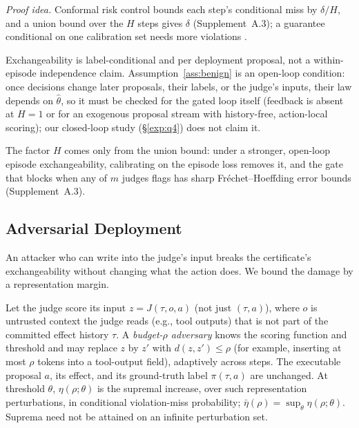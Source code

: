 \noindent\emph{Proof idea.} Conformal risk control \citep{angelopoulos2024conformal} bounds
each step's conditional miss by $\delta/H$, and a union bound over the $H$ steps gives $\delta$
(Supplement~A.3); a guarantee conditional on one calibration set needs more violations
\citep{vovk2012conditional}.

\begin{remark}\label{rem:assumptions}
Exchangeability is label-conditional and per deployment proposal, not a within-episode
independence claim. Assumption~\ref{ass:benign} is an open-loop condition: once decisions
change later proposals, their labels, or the judge's inputs, their law depends on $\hat\theta$,
so it must be checked for the gated loop itself (feedback is absent at $H=1$ or for an exogenous
proposal stream with history-free, action-local scoring); our closed-loop study (\S\ref{exp:q4}) does
not claim it.
\end{remark}

The factor $H$ comes only from the union bound: under a stronger, open-loop episode
exchangeability, calibrating on the episode loss removes it, and the gate that blocks when any of
$m$ judges flags has sharp Fr\'echet--Hoeffding error bounds (Supplement~A.3).

\subsection{Adversarial Deployment}\label{t2:adversarial}

An attacker who can write into the judge's input breaks the certificate's
exchangeability without changing what the action does. We bound the damage by
a representation margin.

\begin{definition}\label{def:adversary}
Let the judge score its input $z=J(\tau,o,a)$ (not just $(\tau,a)$), where $o$ is untrusted context
the judge reads (e.g., tool outputs) that is not part of the committed effect history $\tau$. A
\emph{budget-$\rho$ adversary} knows the scoring function and threshold and may
replace $z$ by $z'$ with $d(z,z')\le\rho$ (for example, inserting at most $\rho$
tokens into a tool-output field), adaptively across steps. The executable proposal
$a$, its effect, and its ground-truth label $\pi(\tau,a)$ are unchanged. At
threshold $\theta$, $\eta(\rho;\theta)$ is the supremal increase, over such
representation perturbations, in conditional violation-miss probability;
$\bar\eta(\rho)=\sup_\theta\eta(\rho;\theta)$. Suprema need not be attained on an
infinite perturbation set.
\end{definition}

